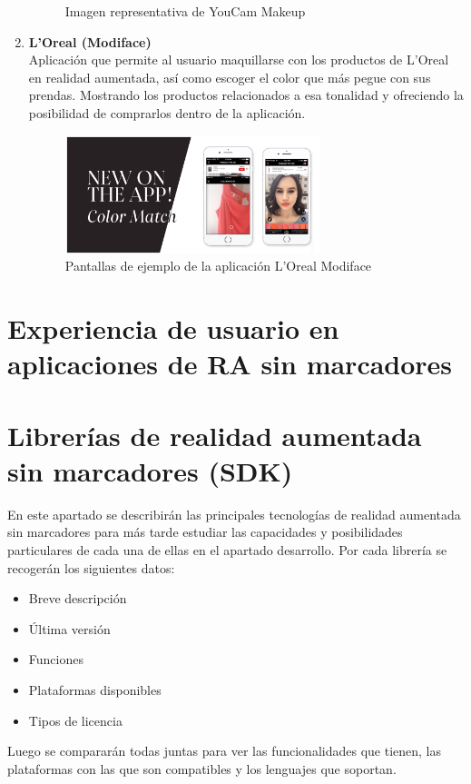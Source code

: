 \begin{enumerate}
\begin{figure}[H]
    \caption{Imagen representativa de YouCam Makeup}
    \label{fig:YouCam}
\end{figure}
\item \textbf{L’Oreal (Modiface)}\\
Aplicación que permite al usuario maquillarse con los productos de L’Oreal en realidad aumentada, así como escoger el color que más pegue con sus prendas. Mostrando los productos relacionados a esa tonalidad y ofreciendo la posibilidad de comprarlos dentro de la aplicación.
\begin{figure}[H]
    \centering
    \includegraphics[width=0.7\textwidth]{Images/Loreal_App.png}
    \caption{Pantallas de ejemplo de la aplicación L'Oreal Modiface}
    \label{fig:Loreal}
\end{figure}
\end{enumerate}
\section{Experiencia de usuario en aplicaciones de RA sin marcadores}

\section{Librerías de realidad aumentada sin marcadores (SDK)}
En este apartado se describirán las principales tecnologías de realidad aumentada sin marcadores para más tarde estudiar las capacidades y posibilidades particulares de cada una de ellas en el apartado desarrollo.
Por cada librería se recogerán los siguientes datos:
\begin{itemize}
\item Breve descripción
\item Última versión
\item Funciones
\item Plataformas disponibles
\item Tipos de licencia
\end{itemize}
Luego se compararán todas juntas para ver las funcionalidades que tienen, las plataformas con las que son compatibles y los lenguajes que soportan.


